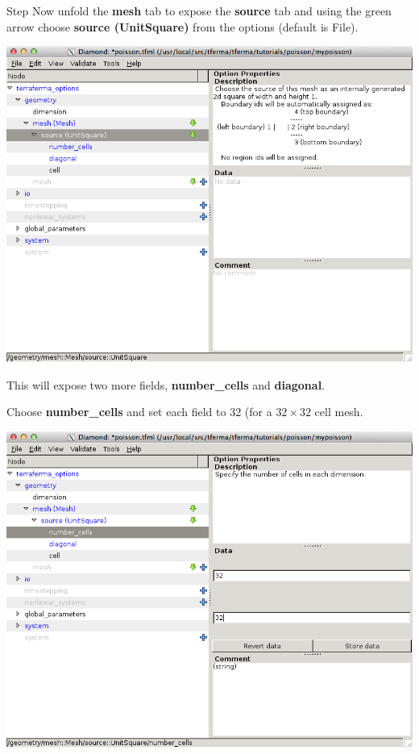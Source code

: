 \begin{steps}{Step}
Now unfold the \textbf{mesh} tab to expose the \textbf{source} tab and
using the green arrow choose \textbf{source (UnitSquare)} from the
options (default is File).
\begin{center}
  \includegraphics[width=\diamondwidth]{figures/screendumps/diamond_poisson_03b.png}
\end{center}
This will expose two more fields, \textbf{number\_cells} and
\textbf{diagonal}.

Choose \textbf{number\_cells} and set each field to 32 (for a
$32\times32$ cell mesh.
\begin{center}
    \includegraphics[width=\diamondwidth]{figures/screendumps/diamond_poisson_03c.png}
\end{center}


\end{steps}
